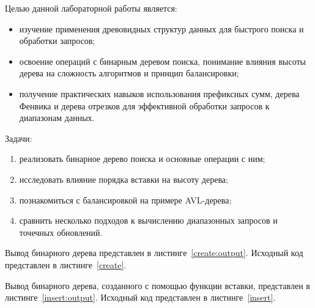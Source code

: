 
Целью данной лабораторной работы является:
\begin{itemize}
	\item изучение применения древовидных структур данных для быстрого поиска и обработки запросов; 
	\item освоение операций с бинарным деревом поиска, понимание влияния высоты дерева на сложность алгоритмов и принцип балансировки; 
	\item получение практических навыков использования префиксных сумм, дерева Фенвика и дерева отрезков для эффективной обработки запросов к диапазонам данных.
\end{itemize}

Задачи:
\begin{enumerate}
	\item реализовать бинарное дерево поиска и основные операции с ним;
	\item исследовать влияние порядка вставки на высоту дерева;
	\item познакомиться с балансировкой на примере AVL-дерева;
	\item сравнить несколько подходов к вычислению диапазонных запросов и точечных обновлений.
\end{enumerate}



Вывод бинарного дерева представлен в листинге~\ref{create:output}. 
Исходный код представлен в листинге~\ref{create}.






Вывод бинарного дерева, созданного с помощью функции вставки, представлен в листинге~\ref{insert:output}. 
Исходный код представлен в листинге~\ref{insert}.

